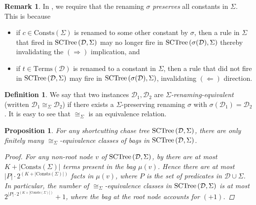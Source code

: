 \documentclass[12pt]{report}
\theoremstyle{plain}
\newtheorem{proposition}[theorem]{Proposition}
\theoremstyle{definition}
\newtheorem{definition}[theorem]{Definition}
\newtheorem{remark}[theorem]{Remark}
\def\Consts{{\mathrm{Consts}}}
\def\Terms{{\mathrm{Terms}}}
\newcommand{\SCTree}[2]{\ensuremath{\normalfont{\textrm{SCTree}} \left( #1, #2 \right)}}
\begin{document}
\begin{remark}
  In , we require that the renaming $\sigma$ \emph{preserves} all constants in $\Sigma$. This is because \begin{itemize}
    \item if $c \in \Consts(\Sigma)$ is renamed to some other constant by $\sigma$, then a rule in $\Sigma$ that fired in $\SCTree{\mathcal{D}}{\Sigma}$ may no longer fire in $\SCTree{\sigma(\mathcal{D})}{\Sigma}$ thereby invalidating the $(\Longrightarrow)$ implication, and
    \item if $t \in \Terms(\mathcal{D})$ is renamed to a constant in $\Sigma$, then a rule that did not fire in $\SCTree{\mathcal{D}}{\Sigma}$ may fire in $\SCTree{\sigma(\mathcal{D})}{\Sigma}$, invalidating $(\Longleftarrow)$ direction.
  \end{itemize}
\end{remark}

\begin{definition}
  We say that two instances $\mathcal{D}_1, \mathcal{D}_2$ are \emph{$\Sigma$-renaming-equivalent} (written $\mathcal{D}_1 \cong_\Sigma \mathcal{D}_2$) if there exists a $\Sigma$-preserving renaming $\sigma$ with $\sigma(\mathcal{D}_1) = \mathcal{D}_2$. It is easy to see that $\cong_\Sigma$ is an equivalence relation.
\end{definition}

\begin{proposition}
\label{renaming-equivalence-class-bound}
  For any shortcutting chase tree $\SCTree{\mathcal{D}}{\Sigma}$, there are only finitely many $\cong_\Sigma$-equivalence classes of bags in $\SCTree{\mathcal{D}}{\Sigma}$.
  \begin{proof}
    For any non-root node $v$ of $\SCTree{\mathcal{D}}{\Sigma}$, by  there are at most $K + |\Consts(\Sigma)|$ terms present in the bag $\mu(v)$. Hence there are at most $|P| \cdot 2^{(K + |\Consts(\Sigma)|)}$ facts in $\mu(v)$, where $P$ is the set of predicates in $\mathcal{D} \cup \Sigma$. In particular, the number of $\cong_\Sigma$-equivalence classes in $\SCTree{\mathcal{D}}{\Sigma}$ is at most $2^{|P| \cdot 2^{(K + |\Consts(\Sigma)|)}} + 1$, where the bag at the root node accounts for $(+1)$.
  \end{proof}
\end{proposition}
\end{document}
